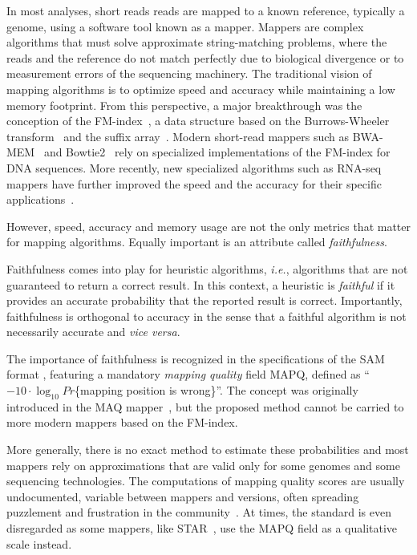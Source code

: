\documentclass[english]{article}
\begin{document}
In most analyses, short reads reads are mapped to a known reference,
typically a genome, using a software tool known as a mapper. Mappers are
complex algorithms that must solve approximate string-matching problems,
where the reads and the reference do not match perfectly due to
biological divergence or to measurement errors of the sequencing
machinery. The traditional vision of mapping algorithms is to optimize
speed and accuracy while maintaining a low memory footprint. From this
perspective, a major breakthrough was the conception of the
FM-index~\cite{ferragina2000opportunistic, ferragina2005indexing}, a data
structure based on the Burrows-Wheeler transform~\cite{burrows1994block}
and the suffix array~\cite{manber1993suffix}. Modern short-read mappers
such as BWA-MEM~\cite{li2013aligning} and Bowtie2~\cite{pmid22388286} rely
on specialized implementations of the FM-index for DNA sequences. More
recently, new specialized algorithms such as RNA-seq mappers have further
improved the speed and the accuracy for their specific
applications~\cite{pmid27043002}.

However, speed, accuracy and memory usage are not the only metrics that
matter for mapping algorithms. Equally important is an attribute called
\emph{faithfulness}.

Faithfulness comes into play for heuristic algorithms, \textit{i.e.},
algorithms that are not guaranteed to return a correct result. In this
context, a heuristic is \emph{faithful} if it provides an accurate
probability that the reported result is correct. Importantly, faithfulness
is orthogonal to accuracy in the sense that a faithful algorithm is not
necessarily accurate and \textit{vice versa}.

\enlargethispage{-65.1pt}

The importance of faithfulness is recognized in the specifications of the
SAM format \cite{pmid19505943}, featuring a mandatory \emph{mapping
quality} field MAPQ, defined as ``$-10 \cdot \log_{10}Pr$\{mapping
position is wrong\}''. The concept was originally introduced in the MAQ
mapper~\cite{pmid18714091}, but the proposed method cannot be carried to
more modern mappers based on the FM-index.

More generally, there is no exact method to estimate these probabilities
and most mappers rely on approximations that are valid only for some
genomes and some sequencing technologies. The computations of mapping
quality scores are usually undocumented, variable between mappers and
versions, often spreading puzzlement and frustration in the
community~\cite{ACGT, QCFail}. At times, the standard is even disregarded
as some mappers, like STAR~\cite{pmid23104886}, use the MAPQ field as a
qualitative scale instead.
\end{document}
